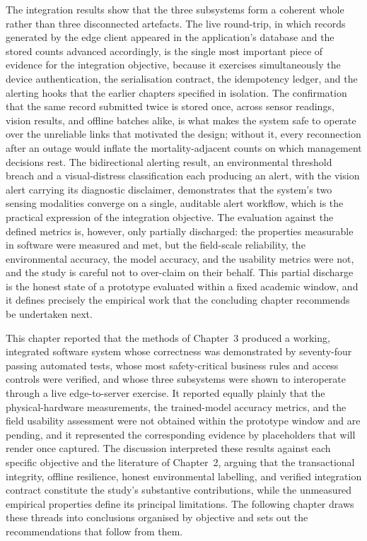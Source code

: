 \documentclass[12pt,a4paper]{report}
\begin{document}
The integration results show that the three subsystems form a coherent whole rather than three disconnected artefacts. The live round-trip, in which records generated by the edge client appeared in the application's database and the stored counts advanced accordingly, is the single most important piece of evidence for the integration objective, because it exercises simultaneously the device authentication, the serialisation contract, the idempotency ledger, and the alerting hooks that the earlier chapters specified in isolation. The confirmation that the same record submitted twice is stored once, across sensor readings, vision results, and offline batches alike, is what makes the system safe to operate over the unreliable links that motivated the design; without it, every reconnection after an outage would inflate the mortality-adjacent counts on which management decisions rest. The bidirectional alerting result, an environmental threshold breach and a visual-distress classification each producing an alert, with the vision alert carrying its diagnostic disclaimer, demonstrates that the system's two sensing modalities converge on a single, auditable alert workflow, which is the practical expression of the integration objective. The evaluation against the defined metrics is, however, only partially discharged: the properties measurable in software were measured and met, but the field-scale reliability, the environmental accuracy, the model accuracy, and the usability metrics were not, and the study is careful not to over-claim on their behalf. This partial discharge is the honest state of a prototype evaluated within a fixed academic window, and it defines precisely the empirical work that the concluding chapter recommends be undertaken next.

This chapter reported that the methods of Chapter~3 produced a working, integrated software system whose correctness was demonstrated by seventy-four passing automated tests, whose most safety-critical business rules and access controls were verified, and whose three subsystems were shown to interoperate through a live edge-to-server exercise. It reported equally plainly that the physical-hardware measurements, the trained-model accuracy metrics, and the field usability assessment were not obtained within the prototype window and are pending, and it represented the corresponding evidence by placeholders that will render once captured. The discussion interpreted these results against each specific objective and the literature of Chapter~2, arguing that the transactional integrity, offline resilience, honest environmental labelling, and verified integration contract constitute the study's substantive contributions, while the unmeasured empirical properties define its principal limitations. The following chapter draws these threads into conclusions organised by objective and sets out the recommendations that follow from them.
\end{document}
